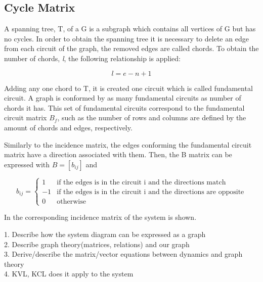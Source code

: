 
\subsection{Cycle Matrix}
\label{CycleSection}
A spanning tree, T, of a G is a subgraph which contains all vertices of G but has no cycles. 
In order to obtain the spanning tree it is necessary to delete an edge from each 
circuit of the graph, the removed edges are called chords. To obtain the number 
of chords, \textit{l}, the following relationship is applied:

\begin{equation}
  \label{Numberofchords}
  l = e - n +1
\end{equation}

Adding any one chord to T, it is created one circuit which is called fundamental 
circuit. A graph is conformed by as many fundamental circuits as number of chords it has.  
This set of fundamental circuits correspond to the fundamental circuit matrix 
$B_f$, such as the number of rows and columns are defined by the amount of chords and edges, respectively. 

Similarly to the incidence matrix, the edges conforming the fundamental circuit 
matrix have a direction associated with them. Then, the B matrix can be 
expressed with $B = [b_{ij}]$ and

\begin{equation}
\label{DiGraphCycle}
 b_{ij} =
		\left\{
		\begin{array}{ll}
		
		1 			&      \text{if the edges is in the circuit i and the directions match}	
\\
		-1                       &     \text{if the edges is in the circuit i and the directions are opposite}
\\

                0                       &      \text{otherwise}

		\end{array}
		\right.
\end{equation}	

In  the corresponding incidence matrix of the system is 
shown.


1. Describe how the system diagram can be expressed as a graph \\
2. Describe graph theory(matrices, relations) and our graph\\
3. Derive/describe the matrix/vector equations between dynamics and graph theory\\
4. KVL, KCL does it apply to the system 
